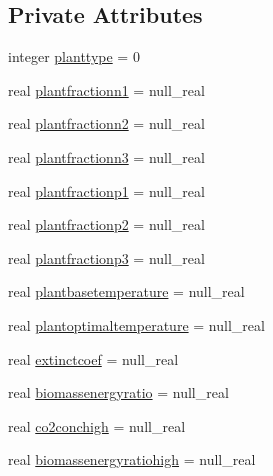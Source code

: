 \subsection*{Private Attributes}
\begin{DoxyCompactItemize}
\item 
integer \mbox{\hyperlink{structmodulevegetation_1_1t__growthdatabase_a4c88c2af2bb6bc76f9fadd8c038ab767}{planttype}} = 0
\item 
real \mbox{\hyperlink{structmodulevegetation_1_1t__growthdatabase_add2b5574baab342fa15e80be8adff54c}{plantfractionn1}} = null\+\_\+real
\item 
real \mbox{\hyperlink{structmodulevegetation_1_1t__growthdatabase_ade29160951bd29fb01a5354131e888b4}{plantfractionn2}} = null\+\_\+real
\item 
real \mbox{\hyperlink{structmodulevegetation_1_1t__growthdatabase_aef4bb77428647d93bcb14f8b40ab4bc2}{plantfractionn3}} = null\+\_\+real
\item 
real \mbox{\hyperlink{structmodulevegetation_1_1t__growthdatabase_a5ed621b3f3f38777a55aa5e9c090add1}{plantfractionp1}} = null\+\_\+real
\item 
real \mbox{\hyperlink{structmodulevegetation_1_1t__growthdatabase_a5f52a924f2c33476f3dedc4773a2e5ba}{plantfractionp2}} = null\+\_\+real
\item 
real \mbox{\hyperlink{structmodulevegetation_1_1t__growthdatabase_a921fe6b79d8d313252dd4941133b59e8}{plantfractionp3}} = null\+\_\+real
\item 
real \mbox{\hyperlink{structmodulevegetation_1_1t__growthdatabase_a5793d715d1db5d7a7a17e6648f2afd8d}{plantbasetemperature}} = null\+\_\+real
\item 
real \mbox{\hyperlink{structmodulevegetation_1_1t__growthdatabase_a3df41b5c18dcdfc11751b0365f79770f}{plantoptimaltemperature}} = null\+\_\+real
\item 
real \mbox{\hyperlink{structmodulevegetation_1_1t__growthdatabase_a7e166cab6a08ffc71b252b15e9a08614}{extinctcoef}} = null\+\_\+real
\item 
real \mbox{\hyperlink{structmodulevegetation_1_1t__growthdatabase_a498fd59ffff53fcd8261aa310e5a450b}{biomassenergyratio}} = null\+\_\+real
\item 
real \mbox{\hyperlink{structmodulevegetation_1_1t__growthdatabase_a5b985a0c2426301fa53c6b9624f2a86d}{co2conchigh}} = null\+\_\+real
\item 
real \mbox{\hyperlink{structmodulevegetation_1_1t__growthdatabase_abd44eca84e07a1f4707e22da5ef83d75}{biomassenergyratiohigh}} = null\+\_\+real

\end{DoxyCompactItemize}

